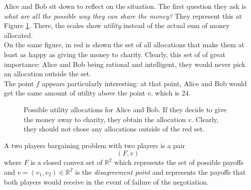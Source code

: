 \begin{example}
Alice and Bob sit down to reflect on the situation.
The first question they ask is \emph{what are all the possible way they can share the money?}
They represent this at Figure \ref{examplePayoff}. There, the scales show \emph{utility} instead of the actual sum of money allocated. \\
On the same figure, in red is shown the set of all allocations that make them at least as happy as giving the money to charity. Clearly, this set of of great importance: Alice and Bob being rational and intelligent, they would never pick an allocation outside the set.\\
The point $f$ appears particularly interesting: at that point, Alice and Bob would get the same amount of utility above the point $v$, which is 24.
\begin{figure}[!ht]
\centering
{}
\caption{Possible utility allocations for Alice and Bob. If they decide to give the money away to charity, they obtain the allocation $v$. Clearly, they should not chose any allocations outside of the red set.}
\label{examplePayoff}
\end{figure}
\end{example}

\begin{definition}
A two players bargaining problem with two players is a pair
$$(F, v)$$ where $F$ is a closed convex set of $\mathbb{R}^2$ which represents the set of possible payoffs and $v = (v_1, v_2) \in \mathbb{R}^2$ is the \emph{disagreement point} and represents the payoffs that both players would receive in the event of failure of the negotiation.
\end{definition}

